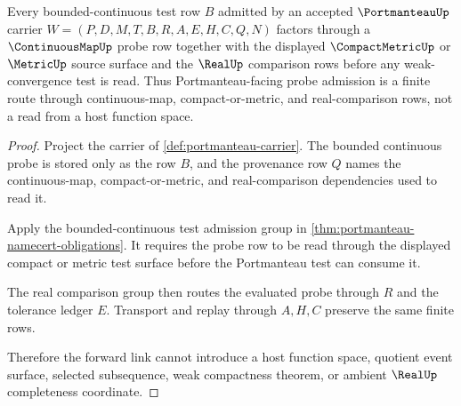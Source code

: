 \begin{theorem}
\label{thm:continuousmap-portmanteau-forward-link}
Every bounded-continuous test row $B$ admitted by an accepted
$\PortmanteauUp$ carrier $W=(P,D,M,T,B,R,A,E,H,C,Q,N)$ factors through a
$\ContinuousMapUp$ probe row together with the displayed $\CompactMetricUp$ or
$\MetricUp$ source surface and the $\RealUp$ comparison rows before any
weak-convergence test is read. Thus Portmanteau-facing probe admission is a
finite route through continuous-map, compact-or-metric, and real-comparison
rows, not a read from a host function space.
\end{theorem}
\begin{proof}
Project the carrier of \autoref{def:portmanteau-carrier}. The bounded
continuous probe is stored only as the row $B$, and the provenance row $Q$
names the continuous-map, compact-or-metric, and real-comparison dependencies
used to read it.

Apply the bounded-continuous test admission group in
\autoref{thm:portmanteau-namecert-obligations}. It requires the probe row to be
read through the displayed compact or metric test surface before the
Portmanteau test can consume it.

The real comparison group then routes the evaluated probe through $R$ and the
tolerance ledger $E$. Transport and replay through $A,H,C$ preserve the same
finite rows.

Therefore the forward link cannot introduce a host function space, quotient
event surface, selected subsequence, weak compactness theorem, or ambient
$\RealUp$ completeness coordinate.
\end{proof}

